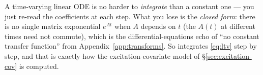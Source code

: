 \begin{intuition}
A time-varying linear ODE is no harder to \emph{integrate} than a constant one ---
you just re-read the coefficients at each step. What you lose is the \emph{closed
form}: there is no single matrix exponential $e^{At}$ when $A$ depends on $t$ (the
$A(t)$ at different times need not commute), which is the differential-equations
echo of ``no constant transfer function'' from Appendix~\ref{app:transforms}. So
 integrates \eqref{eq:ltv} step by step, and that is exactly
how the excitation-covariate model of \S\ref{sec:excitation-cov} is computed.
\end{intuition}
